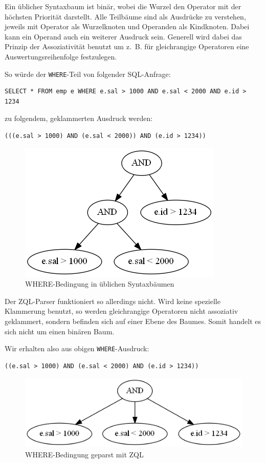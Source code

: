 Ein üblicher Syntaxbaum ist binär, wobei die Wurzel den Operator mit der höchsten Priorität darstellt. Alle Teilbäume sind als Ausdrücke zu verstehen, jeweils mit Operator als Wurzelknoten und Operanden als Kindknoten. Dabei kann ein Operand auch ein weiterer Ausdruck sein. Generell wird dabei das Prinzip der Assoziativität benutzt um \mbox{z. B.} für gleichrangige Operatoren eine Auswertungsreihenfolge festzulegen.

So würde der \verb|WHERE|-Teil von folgender SQL-Anfrage:
\begin{verbatim}
SELECT * FROM emp e WHERE e.sal > 1000 AND e.sal < 2000 AND e.id > 1234
\end{verbatim}

zu folgendem, geklammerten Ausdruck werden:
\begin{verbatim}
(((e.sal > 1000) AND (e.sal < 2000)) AND (e.id > 1234))
\end{verbatim}

\begin{figure}[h]
\label{baum1}
\includegraphics[scale=0.7]{Bilder/where_syntax.png}
\caption{WHERE-Bedingung in üblichen Syntaxbäumen}
\end{figure}

Der ZQL-Parser funktioniert so allerdings nicht. Wird keine spezielle Klammerung benutzt, so werden gleichrangige Operatoren nicht assoziativ geklammert, sondern befinden sich auf einer Ebene des Baumes. Somit handelt es sich nicht um einen binären Baum. 

Wir erhalten also aus obigen \verb|WHERE|-Ausdruck:
\begin{verbatim}
((e.sal > 1000) AND (e.sal < 2000) AND (e.id > 1234))
\end{verbatim}

\begin{figure}
\includegraphics[scale=0.7]{Bilder/with_zql.png}
\caption{WHERE-Bedingung geparst mit ZQL}
\end{figure}

